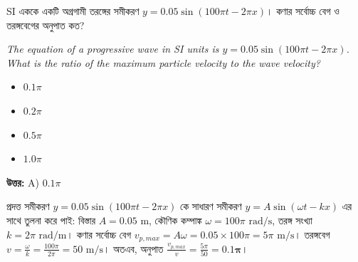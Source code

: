 \documentclass[12pt, a4paper]{article}
\begin{document}
\vspace{2em}

\begin{tcolorbox}[questionbox={প্রশ্ন (Question) 3}]
    \noindent
    SI এককে একটি অগ্রগামী তরঙ্গের সমীকরণ $y = 0.05 \sin (100\pi t - 2\pi x)$। কণার সর্বোচ্চ বেগ ও তরঙ্গবেগের অনুপাত কত?
    
    \vspace{0.8em}
    \begin{english}
    \noindent\textit{\color{darkgray}
    The equation of a progressive wave in SI units is $y = 0.05 \sin (100\pi t - 2\pi x)$. What is the ratio of the maximum particle velocity to the wave velocity?
    }
    \end{english}
\end{tcolorbox}

\begin{itemize}[label={}, leftmargin=1cm, itemsep=0.5em]
    \item[\textbf{A)}] $0.1\pi$
    \item[\textbf{B)}] $0.2\pi$
    \item[\textbf{C)}] $0.5\pi$
    \item[\textbf{D)}] $1.0\pi$
\end{itemize}

\vspace{0.5em}
\begin{tcolorbox}[answerbox]
    \textbf{\color{success} উত্তর:} A) $0.1\pi$
\end{tcolorbox}
\vspace{1em}

\begin{tcolorbox}[solutionbox={সমাধান (Solution)}]
    \noindent
    প্রদত্ত সমীকরণ $y = 0.05 \sin (100\pi t - 2\pi x)$ কে সাধারণ সমীকরণ $y = A \sin (\omega t - kx)$ এর সাথে তুলনা করে পাই: বিস্তার $A = 0.05\text{ m}$, কৌণিক কম্পাঙ্ক $\omega = 100\pi\text{ rad/s}$, তরঙ্গ সংখ্যা $k = 2\pi\text{ rad/m}$। কণার সর্বোচ্চ বেগ $v_{p,max} = A \omega = 0.05 \times 100\pi = 5\pi\text{ m/s}$। তরঙ্গবেগ $v = \frac{\omega}{k} = \frac{100\pi}{2\pi} = 50\text{ m/s}$। অতএব, অনুপাত $\frac{v_{p,max}}{v} = \frac{5\pi}{50} = \mathbf{0.1\pi}$।
\end{tcolorbox}

\vspace{2em}
\end{document}
